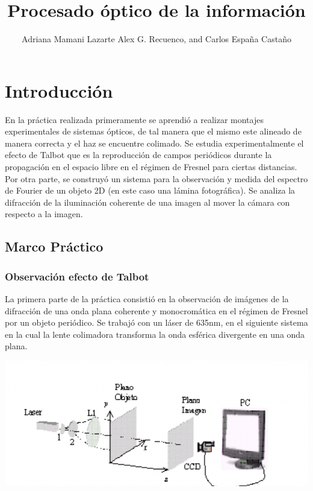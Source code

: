 \documentclass{./packages/optica-article}
\begin{document}
\title{Procesado óptico de la información}

\author{Adriana Mamani Lazarte Alex G. Recuenco, and Carlos España Castaño}

\address{Universidad Complutense de Madrid, Madrid, PC 28040, España}

\tableofcontents
\section{Introducción}
En la práctica realizada primeramente se aprendió a realizar montajes experimentales de sistemas ópticos, de tal manera que el mismo este alineado de manera correcta y el haz se encuentre colimado. 
Se estudia experimentalmente el efecto de Talbot que es la reproducción de campos periódicos durante la propagación en el espacio
libre en el régimen de Fresnel para ciertas distancias. 
Por otra parte, se construyó un sistema para la observación y medida del espectro de Fourier de un objeto 2D (en este caso una lámina fotográfica). 
Se analiza la difracción de la iluminación coherente de una imagen al mover la cámara con respecto a la imagen.


\subsection{Marco Práctico}
\subsubsection{Observación efecto de Talbot}

La primera parte de la práctica consistió en la observación de imágenes de la difracción de una onda plana coherente y monocromática en el régimen de Fresnel por un objeto periódico.
Se trabajó con un láser de 635nm, en el siguiente sistema en la cual la lente colimadora transforma la onda esférica divergente en una onda plana.

\begin{center}
	\includegraphics[scale=1]{sistematalbot.png}
	\label{fig:talbot} %
\end{center}
\end{document}
